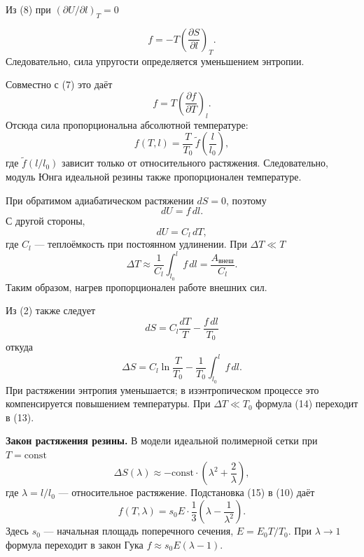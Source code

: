 \documentclass[12pt,a4paper]{article}
\numberwithin{equation}{section}
\begin{document}
Из (8) при $\left(\partial U/\partial l\right)_T=0$

\begin{equation}\tag{10}
    f = -T\left(\frac{\partial S}{\partial l}\right)_T.
\end{equation}
Следовательно, сила упругости определяется уменьшением энтропии.

Совместно с (7) это даёт
\begin{equation}\tag{11}
    f = T\left(\frac{\partial f}{\partial T}\right)_l.
\end{equation}
Отсюда сила пропорциональна абсолютной температуре:
\begin{equation}\tag{12}
    f(T,l) = \frac{T}{T_0}\,\tilde f\left(\frac{l}{l_0}\right),
\end{equation}
где $\tilde f(l/l_0)$ зависит только от относительного растяжения. Следовательно, модуль Юнга идеальной резины также пропорционален температуре.

При обратимом адиабатическом растяжении $dS=0$, поэтому
\[
    dU = f\,dl.
\]
С другой стороны,
\[
    dU = C_l\,dT,
\]
где $C_l$ --- теплоёмкость при постоянном удлинении. При $\Delta T\ll T$
\begin{equation}\tag{13}
    \Delta T \approx \frac{1}{C_l}\int_{l_0}^{l} f\,dl
    = \frac{A_{\text{внеш}}}{C_l}.
\end{equation}
Таким образом, нагрев пропорционален работе внешних сил.

Из (2) также следует
\[
    dS = C_l\frac{dT}{T} - \frac{f\,dl}{T_0}
\]
откуда
\begin{equation}\tag{14}
    \Delta S = C_l\ln\frac{T}{T_0} - \frac{1}{T_0}\int_{l_0}^{l} f\,dl.
\end{equation}
При растяжении энтропия уменьшается; в изэнтропическом процессе это компенсируется повышением температуры. При $\Delta T\ll T_0$ формула (14) переходит в (13).

\noindent\textbf{Закон растяжения резины.} В модели идеальной полимерной сетки при $T=\mathrm{const}$
\begin{equation}\tag{15}
    \Delta S(\lambda) \approx -\mathrm{const}\cdot\left(\lambda^2 + \frac{2}{\lambda}\right),
\end{equation}
где $\lambda=l/l_0$ --- относительное растяжение. Подстановка (15) в (10) даёт
\begin{equation}\tag{16}
    f(T,\lambda) = s_0 E\cdot \frac{1}{3}\left(\lambda - \frac{1}{\lambda^2}\right).
\end{equation}
Здесь $s_0$ --- начальная площадь поперечного сечения, $E=E_0T/T_0$. При $\lambda\to1$ формула переходит в закон Гука $f\approx s_0E(\lambda-1)$.
\end{document}
